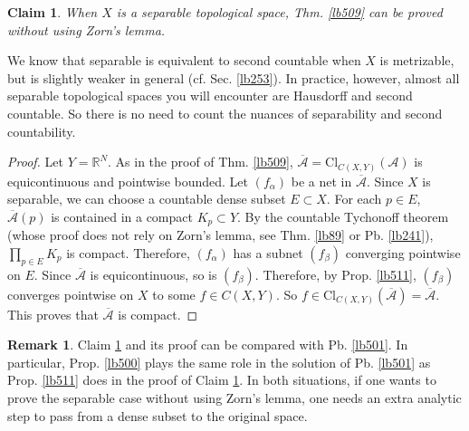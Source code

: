 \documentclass[12pt,b5paper,notitlepage]{article}
\theoremstyle{definition}
\newtheorem{rem}[df]{Remark}
\theoremstyle{plain}
\newtheorem{claim}[df]{Claim}
\newcommand{\ovl}{\overline}
\newcommand{\scr}{\mathscr}
\newcommand{\Rbb}{\mathbb R}
\newcommand{\Cl}{\mathrm{Cl}}
\numberwithin{equation}{section}
\begin{document}
\begin{claim}\label{lb510}
When $X$ is a separable topological space, Thm. \ref{lb509} can be proved without using Zorn's lemma.
\end{claim}

We know that separable is equivalent to second countable when $X$ is metrizable, but is slightly weaker in general (cf. Sec. \ref{lb253}). In practice, however, almost all separable topological spaces you will encounter are Hausdorff and second countable. So there is no need to count the nuances of separability and second countability.

\begin{proof}
Let $Y=\Rbb^N$. As in the proof of Thm. \ref{lb509}, $\ovl{\scr A}=\Cl_{C(X,Y)}(\scr A)$ is equicontinuous and pointwise bounded. Let $(f_\alpha)$ be a net in $\ovl{\scr A}$. Since $X$ is separable, we can choose a countable dense subset $E\subset X$. For each $p\in E$, $\ovl{\scr A}(p)$ is contained in a compact $K_p\subset Y$. By the countable Tychonoff theorem (whose proof does not rely on Zorn's lemma, see Thm. \ref{lb89} or Pb. \ref{lb241}), $\prod_{p\in E}K_p$ is compact. Therefore, $(f_\alpha)$ has a subnet $(f_\beta)$ converging pointwise on $E$. Since $\ovl{\scr A}$ is equicontinuous, so is $(f_\beta)$. Therefore, by Prop. \ref{lb511}, $(f_\beta)$ converges pointwise on $X$ to some $f\in C(X,Y)$. So $f\in\Cl_{C(X,Y)}(\ovl{\scr A})=\ovl{\scr A}$. This proves that $\ovl{\scr A}$ is compact.
\end{proof}

\begin{rem}
Claim \ref{lb510} and its proof can be compared with Pb. \ref{lb501}. In particular,  Prop. \ref{lb500} plays the same role in the solution of Pb. \ref{lb501} as Prop. \ref{lb511} does in the proof of Claim \ref{lb510}. In both situations, if one wants to prove the separable case without using Zorn's lemma, one needs an extra analytic step to pass from a dense subset to the original space. 
\end{rem}
\end{document}
